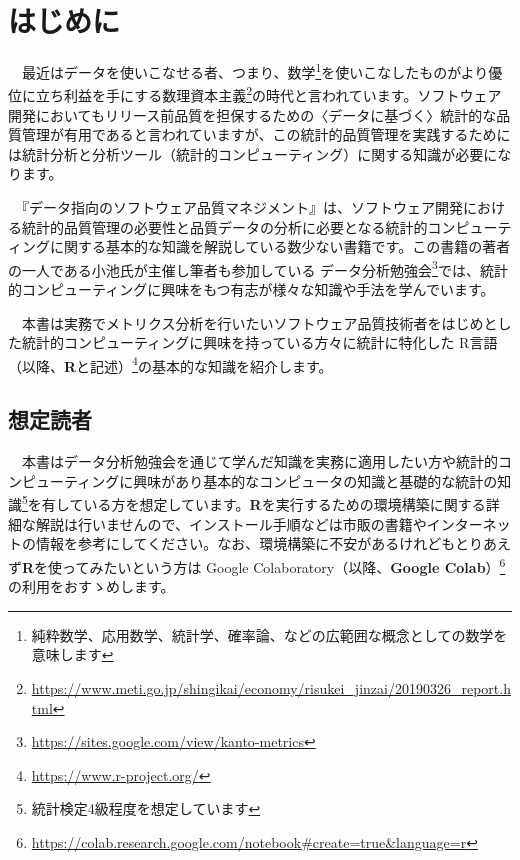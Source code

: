\documentclass[
  12pt,
]{book}
\DeclareRobustCommand{\href}[2]{#2\footnote{\url{#1}}}
\begin{document}
\hypertarget{ux306fux3058ux3081ux306b}{%
\chapter*{はじめに}\label{ux306fux3058ux3081ux306b}}

　最近はデータを使いこなせる者、つまり、数学\footnote{純粋数学、応用数学、統計学、確率論、などの広範囲な概念としての数学を意味します}を使いこなしたものがより優位に立ち利益を手にする\href{https://www.meti.go.jp/shingikai/economy/risukei_jinzai/20190326_report.html}{数理資本主義}の時代と言われています。ソフトウェア開発においてもリリース前品質を担保するための〈データに基づく〉統計的な品質管理が有用であると言われていますが、この統計的品質管理を実践するためには統計分析と分析ツール（統計的コンピューティング）に関する知識が必要になります。

　『データ指向のソフトウェア品質マネジメント』\citep{DataOrientedManagement}は、ソフトウェア開発における統計的品質管理の必要性と品質データの分析に必要となる統計的コンピューティングに関する基本的な知識を解説している数少ない書籍です。この書籍の著者の一人である小池氏が主催し筆者も参加している \href{https://sites.google.com/view/kanto-metrics}{データ分析勉強会}では、統計的コンピューティングに興味をもつ有志が様々な知識や手法を学んでいます。

　本書は実務でメトリクス分析を行いたいソフトウェア品質技術者をはじめとした統計的コンピューティングに興味を持っている方々に統計に特化した \href{https://www.r-project.org/}{R言語（以降、\textbf{R}と記述）}の基本的な知識を紹介します。

\hypertarget{ux60f3ux5b9aux8aadux8005}{%
\section*{想定読者}\label{ux60f3ux5b9aux8aadux8005}}

　本書はデータ分析勉強会を通じて学んだ知識を実務に適用したい方や統計的コンピューティングに興味があり基本的なコンピュータの知識と基礎的な統計の知識\footnote{統計検定4級程度を想定しています}を有している方を想定しています。\textbf{R}を実行するための環境構築に関する詳細な解説は行いませんので、インストール手順などは市販の書籍やインターネットの情報を参考にしてください。なお、環境構築に不安があるけれどもとりあえず\textbf{R}を使ってみたいという方は \href{https://colab.research.google.com/notebook\#create=true\&language=r}{Google Colaboratory（以降、\textbf{Google Colab}）}の利用をおすゝめします。
\end{document}
